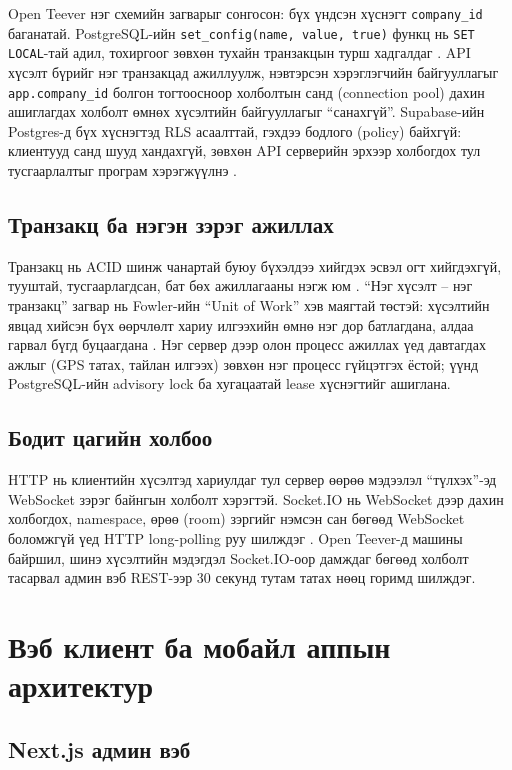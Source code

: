 \documentclass[
12pt,
oneside,
english,
onehalfspacing,
nolistspacing,
headsepline,
]{MUST-Thesis}
\begin{document}
Open Teever нэг схемийн загварыг сонгосон: бүх үндсэн хүснэгт \texttt{company\_id} баганатай. PostgreSQL-ийн \texttt{set\_config(name, value, true)} функц нь \texttt{SET LOCAL}-тай адил, тохиргоог зөвхөн тухайн транзакцын турш хадгалдаг \cite{postgresdocs}. API хүсэлт бүрийг нэг транзакцад ажиллуулж, нэвтэрсэн хэрэглэгчийн байгууллагыг \texttt{app.company\_id} болгон тогтоосноор холболтын санд (connection pool) дахин ашиглагдах холболт өмнөх хүсэлтийн байгууллагыг ``санахгүй''. Supabase-ийн Postgres-д бүх хүснэгтэд RLS асаалттай, гэхдээ бодлого (policy) байхгүй: клиентууд санд шууд хандахгүй, зөвхөн API серверийн эрхээр холбогдох тул тусгаарлалтыг програм хэрэгжүүлнэ \cite{supabasedocs}.

\subsection{Транзакц ба нэгэн зэрэг ажиллах}

Транзакц нь ACID шинж чанартай буюу бүхэлдээ хийгдэх эсвэл огт хийгдэхгүй, тууштай, тусгаарлагдсан, бат бөх ажиллагааны нэгж юм \cite{kleppmann2017ddia}. ``Нэг хүсэлт -- нэг транзакц'' загвар нь Fowler-ийн ``Unit of Work'' хэв маягтай төстэй: хүсэлтийн явцад хийсэн бүх өөрчлөлт хариу илгээхийн өмнө нэг дор батлагдана, алдаа гарвал бүгд буцаагдана \cite{fowler2002peaa}. Нэг сервер дээр олон процесс ажиллах үед давтагдах ажлыг (GPS татах, тайлан илгээх) зөвхөн нэг процесс гүйцэтгэх ёстой; үүнд PostgreSQL-ийн advisory lock ба хугацаатай lease хүснэгтийг ашиглана.

\subsection{Бодит цагийн холбоо}

HTTP нь клиентийн хүсэлтэд хариулдаг тул сервер өөрөө мэдээлэл ``түлхэх''-эд WebSocket зэрэг байнгын холболт хэрэгтэй. Socket.IO нь WebSocket дээр дахин холбогдох, namespace, өрөө (room) зэргийг нэмсэн сан бөгөөд WebSocket боломжгүй үед HTTP long-polling руу шилждэг \cite{socketiodocs}. Open Teever-д машины байршил, шинэ хүсэлтийн мэдэгдэл Socket.IO-оор дамждаг бөгөөд холболт тасарвал админ вэб REST-ээр 30 секунд тутам татах нөөц горимд шилждэг.

\section{Вэб клиент ба мобайл аппын архитектур}

\subsection{Next.js админ вэб}
\end{document}
